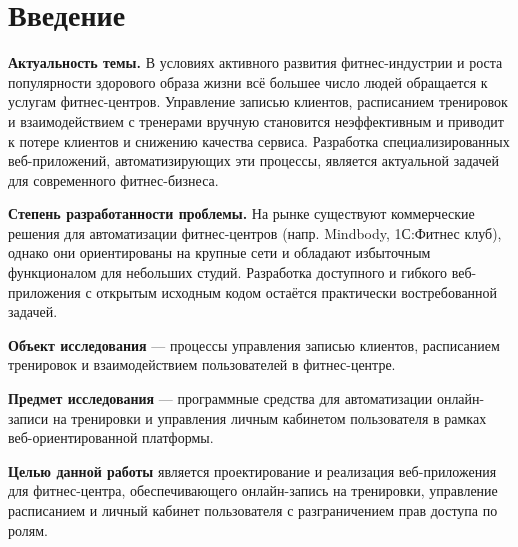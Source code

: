\section*{Введение}

\textbf{Актуальность темы.} В условиях активного развития фитнес-индустрии
и роста популярности здорового образа жизни всё большее число людей обращается
к услугам фитнес-центров. Управление записью клиентов, расписанием тренировок
и взаимодействием с тренерами вручную становится неэффективным и приводит к
потере клиентов и снижению качества сервиса. Разработка специализированных
веб-приложений, автоматизирующих эти процессы, является актуальной задачей
для современного фитнес-бизнеса.

\textbf{Степень разработанности проблемы.} На рынке существуют коммерческие
решения для автоматизации фитнес-центров (напр. Mindbody, 1С:Фитнес клуб),
однако они ориентированы на крупные сети и обладают избыточным функционалом
для небольших студий. Разработка доступного и гибкого веб-приложения с открытым
исходным кодом остаётся практически востребованной задачей.

\textbf{Объект исследования} — процессы управления записью клиентов,
расписанием тренировок и взаимодействием пользователей в фитнес-центре.

\textbf{Предмет исследования} — программные средства для автоматизации
онлайн-записи на тренировки и управления личным кабинетом пользователя
в рамках веб-ориентированной платформы.

\textbf{Целью данной работы} является проектирование и реализация
веб-приложения для фитнес-центра, обеспечивающего онлайн-запись на тренировки,
управление расписанием и личный кабинет пользователя с разграничением прав
доступа по ролям.